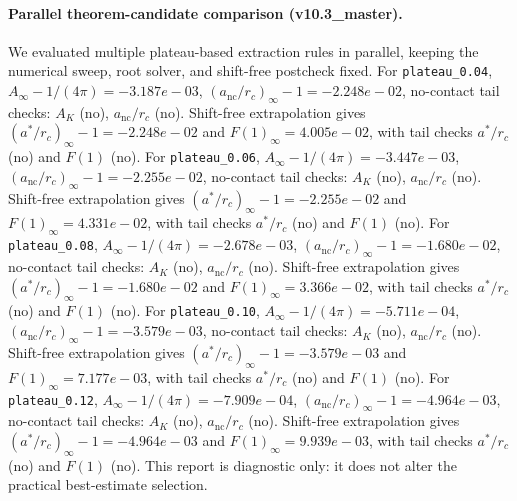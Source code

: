 \paragraph{Parallel theorem-candidate comparison (v10.3_master).}
We evaluated multiple plateau-based extraction rules in parallel, keeping the numerical sweep, root solver, and shift-free postcheck fixed. For \texttt{plateau_0.04}, $A_\infty-1/(4\pi)=-3.187e-03$, $(a_{\mathrm{nc}}/r_c)_\infty-1=-2.248e-02$, no-contact tail checks: $A_K$ (no), $a_{\mathrm{nc}}/r_c$ (no). Shift-free extrapolation gives $(a^*/r_c)_\infty-1=-2.248e-02$ and $F(1)_\infty=4.005e-02$, with tail checks $a^*/r_c$ (no) and $F(1)$ (no). For \texttt{plateau_0.06}, $A_\infty-1/(4\pi)=-3.447e-03$, $(a_{\mathrm{nc}}/r_c)_\infty-1=-2.255e-02$, no-contact tail checks: $A_K$ (no), $a_{\mathrm{nc}}/r_c$ (no). Shift-free extrapolation gives $(a^*/r_c)_\infty-1=-2.255e-02$ and $F(1)_\infty=4.331e-02$, with tail checks $a^*/r_c$ (no) and $F(1)$ (no). For \texttt{plateau_0.08}, $A_\infty-1/(4\pi)=-2.678e-03$, $(a_{\mathrm{nc}}/r_c)_\infty-1=-1.680e-02$, no-contact tail checks: $A_K$ (no), $a_{\mathrm{nc}}/r_c$ (no). Shift-free extrapolation gives $(a^*/r_c)_\infty-1=-1.680e-02$ and $F(1)_\infty=3.366e-02$, with tail checks $a^*/r_c$ (no) and $F(1)$ (no). For \texttt{plateau_0.10}, $A_\infty-1/(4\pi)=-5.711e-04$, $(a_{\mathrm{nc}}/r_c)_\infty-1=-3.579e-03$, no-contact tail checks: $A_K$ (no), $a_{\mathrm{nc}}/r_c$ (no). Shift-free extrapolation gives $(a^*/r_c)_\infty-1=-3.579e-03$ and $F(1)_\infty=7.177e-03$, with tail checks $a^*/r_c$ (no) and $F(1)$ (no). For \texttt{plateau_0.12}, $A_\infty-1/(4\pi)=-7.909e-04$, $(a_{\mathrm{nc}}/r_c)_\infty-1=-4.964e-03$, no-contact tail checks: $A_K$ (no), $a_{\mathrm{nc}}/r_c$ (no). Shift-free extrapolation gives $(a^*/r_c)_\infty-1=-4.964e-03$ and $F(1)_\infty=9.939e-03$, with tail checks $a^*/r_c$ (no) and $F(1)$ (no). This report is diagnostic only: it does not alter the practical best-estimate selection.
